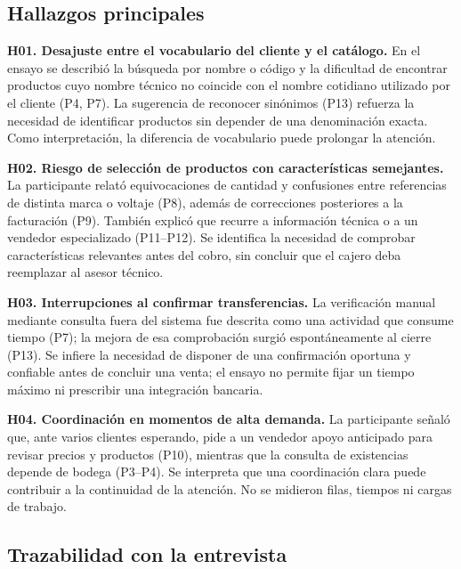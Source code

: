 \subsection{Hallazgos principales}

\noindent\textbf{H01. Desajuste entre el vocabulario del cliente y el catálogo.} En el ensayo se describió la búsqueda por nombre o código y la dificultad de encontrar productos cuyo nombre técnico no coincide con el nombre cotidiano utilizado por el cliente (P4, P7). La sugerencia de reconocer sinónimos (P13) refuerza la necesidad de identificar productos sin depender de una denominación exacta. Como interpretación, la diferencia de vocabulario puede prolongar la atención.

\noindent\textbf{H02. Riesgo de selección de productos con características semejantes.} La participante relató equivocaciones de cantidad y confusiones entre referencias de distinta marca o voltaje (P8), además de correcciones posteriores a la facturación (P9). También explicó que recurre a información técnica o a un vendedor especializado (P11--P12). Se identifica la necesidad de comprobar características relevantes antes del cobro, sin concluir que el cajero deba reemplazar al asesor técnico.

\noindent\textbf{H03. Interrupciones al confirmar transferencias.} La verificación manual mediante consulta fuera del sistema fue descrita como una actividad que consume tiempo (P7); la mejora de esa comprobación surgió espontáneamente al cierre (P13). Se infiere la necesidad de disponer de una confirmación oportuna y confiable antes de concluir una venta; el ensayo no permite fijar un tiempo máximo ni prescribir una integración bancaria.

\noindent\textbf{H04. Coordinación en momentos de alta demanda.} La participante señaló que, ante varios clientes esperando, pide a un vendedor apoyo anticipado para revisar precios y productos (P10), mientras que la consulta de existencias depende de bodega (P3--P4). Se interpreta que una coordinación clara puede contribuir a la continuidad de la atención. No se midieron filas, tiempos ni cargas de trabajo.

\subsection{Trazabilidad con la entrevista}

